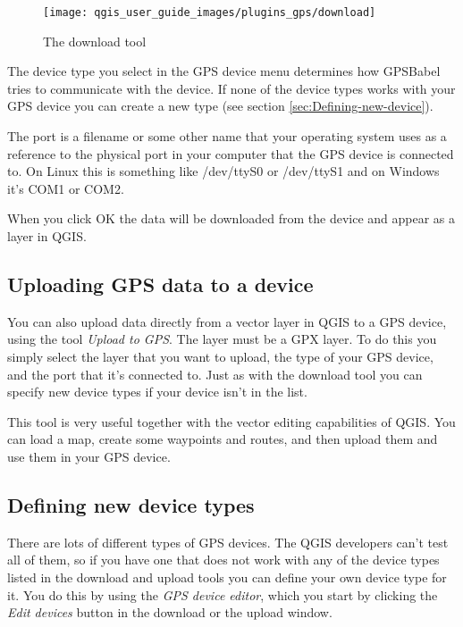 %
\begin{figure}

\caption{\label{figure_download}The download tool}

\texttt{[image: qgis\_user\_guide\_images/plugins\_gps/download]}
\end{figure}


The device type you select in the GPS device menu determines how GPSBabel
tries to communicate with the device. If none of the device types
works with your GPS device you can create a new type (see section
\ref{sec:Defining-new-device}).

The port is a filename or some other name that your operating system
uses as a reference to the physical port in your computer that the
GPS device is connected to. On Linux this is something like /dev/ttyS0
or /dev/ttyS1 and on Windows it's COM1 or COM2.

When you click OK the data will be downloaded from the device and
appear as a layer in QGIS.


\subsection{Uploading GPS data to a device}

You can also upload data directly from a vector layer in QGIS to a
GPS device, using the tool \emph{Upload to GPS}. The layer must be
a GPX layer. To do this you simply select the layer that you want
to upload, the type of your GPS device, and the port that it's connected
to. Just as with the download tool you can specify new device types
if your device isn't in the list.

This tool is very useful together with the vector editing capabilities
of QGIS. You can load a map, create some waypoints and routes, and
then upload them and use them in your GPS device.


\subsection{\label{sec:Defining-new-device}Defining new device types}

There are lots of different types of GPS devices. The QGIS developers
can't test all of them, so if you have one that does not work with
any of the device types listed in the download and upload tools you
can define your own device type for it. You do this by using the \emph{GPS
device editor}, which you start by clicking the \emph{Edit devices}
button in the download or the upload window.

